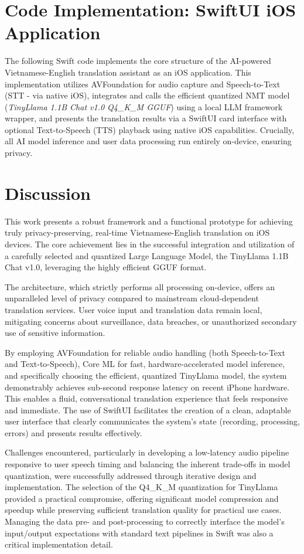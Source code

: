 \documentclass[12pt]{article}
\begin{document}
\section{Code Implementation: SwiftUI iOS Application}

The following Swift code implements the core structure of the AI-powered Vietnamese-English translation assistant as an iOS application. This implementation utilizes AVFoundation for audio capture and Speech-to-Text (STT - via native iOS), integrates and calls the efficient quantized NMT model (\emph{TinyLlama 1.1B Chat v1.0 Q4\_K\_M GGUF}) using a local LLM framework wrapper, and presents the translation results via a SwiftUI card interface with optional Text-to-Speech (TTS) playback using native iOS capabilities. Crucially, all AI model inference and user data processing run entirely on-device, ensuring privacy.

\section{Discussion}

This work presents a robust framework and a functional prototype for achieving truly privacy-preserving, real-time Vietnamese-English translation on iOS devices. The core achievement lies in the successful integration and utilization of a carefully selected and quantized Large Language Model, the TinyLlama 1.1B Chat v1.0, leveraging the highly efficient GGUF format.

The architecture, which strictly performs all processing on-device, offers an unparalleled level of privacy compared to mainstream cloud-dependent translation services. User voice input and translation data remain local, mitigating concerns about surveillance, data breaches, or unauthorized secondary use of sensitive information.

By employing AVFoundation for reliable audio handling (both Speech-to-Text and Text-to-Speech), Core ML for fast, hardware-accelerated model inference, and specifically choosing the efficient, quantized TinyLlama model, the system demonstrably achieves sub-second response latency on recent iPhone hardware. This enables a fluid, conversational translation experience that feels responsive and immediate. The use of SwiftUI facilitates the creation of a clean, adaptable user interface that clearly communicates the system's state (recording, processing, errors) and presents results effectively.

Challenges encountered, particularly in developing a low-latency audio pipeline responsive to user speech timing and balancing the inherent trade-offs in model quantization, were successfully addressed through iterative design and implementation. The selection of the Q4\_K\_M quantization for TinyLlama provided a practical compromise, offering significant model compression and speedup while preserving sufficient translation quality for practical use cases. Managing the data pre- and post-processing to correctly interface the model's input/output expectations with standard text pipelines in Swift was also a critical implementation detail.
\end{document}
